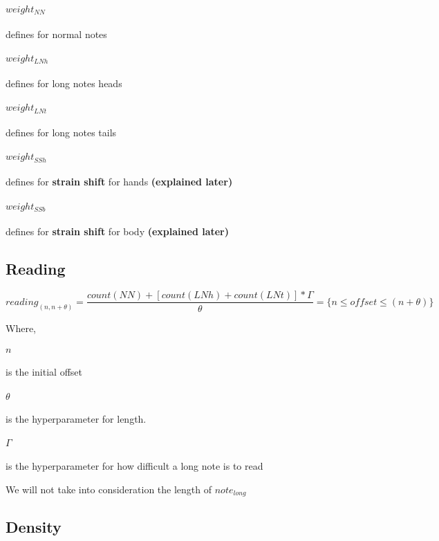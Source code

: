 \paragraph{$weight_{NN}$} defines for normal notes
\paragraph{$weight_{LNh}$} defines for long notes heads
\paragraph{$weight_{LNt}$} defines for long notes tails
\paragraph{$weight_{SSh}$} defines for \textbf{strain shift} for hands \textbf{(explained later)}
\paragraph{$weight_{SSb}$} defines for \textbf{strain shift} for body \textbf{(explained later)}

\subsection{Reading}

$$ reading_{(n,n+\theta)} = 
\frac{ count(NN) + \left[ count(LNh) + count(LNt)\right] * \Gamma }{\theta}
= \lbrace n \leq offset \leq (n+ \theta) \rbrace$$

Where,

\paragraph{$n$} is the initial offset
\paragraph{$\theta$} is the hyperparameter for length.
\paragraph{$\Gamma$} is the hyperparameter for how difficult a long note is to read

We will not take into consideration the length of $note_{long}$

\subsection{Density}

